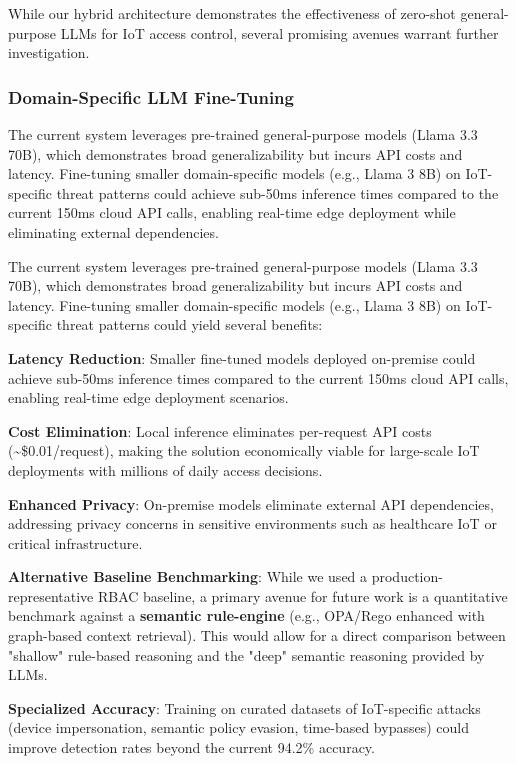 \documentclass[conference]{IEEEtran}
\begin{document}
While our hybrid architecture demonstrates the effectiveness of zero-shot general-purpose LLMs for IoT access control, several promising avenues warrant further investigation.

\subsubsection{Domain-Specific LLM Fine-Tuning}
The current system leverages pre-trained general-purpose models (Llama 3.3 70B), which demonstrates broad generalizability but incurs API costs and latency. Fine-tuning smaller domain-specific models (e.g., Llama 3 8B) on IoT-specific threat patterns could achieve sub-50ms inference times compared to the current 150ms cloud API calls, enabling real-time edge deployment while eliminating external dependencies.



The current system leverages pre-trained general-purpose models (Llama 3.3 70B), which demonstrates broad generalizability but incurs API costs and latency. Fine-tuning smaller domain-specific models (e.g., Llama 3 8B) on IoT-specific threat patterns could yield several benefits:

\textbf{Latency Reduction}: Smaller fine-tuned models deployed on-premise could achieve sub-50ms inference times compared to the current 150ms cloud API calls, enabling real-time edge deployment scenarios.

\textbf{Cost Elimination}: Local inference eliminates per-request API costs (\textasciitilde\$0.01/request), making the solution economically viable for large-scale IoT deployments with millions of daily access decisions.

\textbf{Enhanced Privacy}: On-premise models eliminate external API dependencies, addressing privacy concerns in sensitive environments such as healthcare IoT or critical infrastructure.

\textbf{Alternative Baseline Benchmarking}: While we used a production-representative RBAC baseline, a primary avenue for future work is a quantitative benchmark against a \textbf{semantic rule-engine} (e.g., OPA/Rego enhanced with graph-based context retrieval). This would allow for a direct comparison between "shallow" rule-based reasoning and the "deep" semantic reasoning provided by LLMs.

\textbf{Specialized Accuracy}: Training on curated datasets of IoT-specific attacks (device impersonation, semantic policy evasion, time-based bypasses) could improve detection rates beyond the current 94.2\% accuracy.
\end{document}
